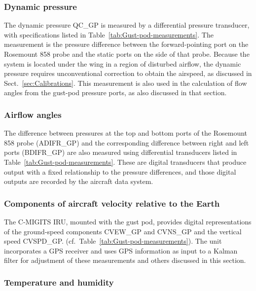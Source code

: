 \documentclass[12pt,twoside,english]{article}\usepackage[]{graphicx}\usepackage[]{color}
\let\OrgIndex\index
\renewcommand*{\index}[1]{\OrgIndex{#1}}
\begin{document}
\subsubsection{Dynamic pressure}

The dynamic pressure QC\_GP is measured by a differential pressure transducer,  with specifications listed in Table~\ref{tab:Gust-pod-measurements}. The measurement is the pressure difference between the forward-pointing port on the Rosemount 858 probe and the static ports on the side of that probe. Because the system is located under the wing in a region of disturbed airflow, the dynamic pressure requires unconventional correction to obtain the airspeed, as discussed in Sect.~\ref{sec:Calibrations}. This measurement is also used in the calculation of flow angles from the gust-pod pressure ports, as also discussed in that section. 


\subsubsection{Airflow angles}

The difference between pressures at  the top and bottom ports of the Rosemount 858 probe (ADIFR\_GP) and the corresponding difference between right and left ports (BDIFR\_GP) are also measured using differential transducers listed in Table~\ref{tab:Gust-pod-measurements}. These are digital transducers that produce output with a fixed relationship to the pressure differences, and those digital outputs are recorded by the aircraft data system. 


\subsubsection{Components of aircraft velocity relative to the Earth}

The C-MIGITS IRU, mounted with the gust pod, provides digital representations of the ground-speed components CVEW\_GP and CVNS\_GP and the vertical speed CVSPD\_GP. (cf.~Table~\ref{tab:Gust-pod-measurements}). The unit incorporates a GPS receiver and uses GPS information as input to a Kalman filter for adjustment of these measurements and others discussed in this section. 


\subsubsection{Temperature and humidity}
\end{document}
